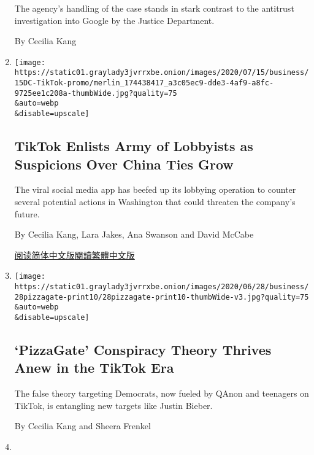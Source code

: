 \begin{enumerate}
  The agency's handling of the case stands in stark contrast to the
  antitrust investigation into Google by the Justice Department.

  By Cecilia Kang
\item
  \href{/2020/07/15/technology/tiktok-washington-lobbyist.html}{}

  \texttt{[image: https://static01.graylady3jvrrxbe.onion/images/2020/07/15/business/15DC-TikTok-promo/merlin\_174438417\_a3c05ec9-dde3-4af9-a8fc-9725ee1c208a-thumbWide.jpg?quality=75\\\&auto=webp\\\&disable=upscale]}

  \hypertarget{tiktok-enlists-army-of-lobbyists-as-suspicions-over-china-ties-grow}{%
  \subsection{TikTok Enlists Army of Lobbyists as Suspicions Over China
  Ties
  Grow}\label{tiktok-enlists-army-of-lobbyists-as-suspicions-over-china-ties-grow}}

  The viral social media app has beefed up its lobbying operation to
  counter several potential actions in Washington that could threaten
  the company's future.

  By Cecilia Kang, Lara Jakes, Ana Swanson and David McCabe

  \href{https://cn.nytimes3xbfgragh.onion/technology/20200716/tiktok-washington-lobbyist/}{阅读简体中文版}\href{https://cn.nytimes3xbfgragh.onion/technology/20200716/tiktok-washington-lobbyist/zh-hant/}{閱讀繁體中文版}
\item
  \href{/2020/06/27/technology/pizzagate-justin-bieber-qanon-tiktok.html}{}

  \texttt{[image: https://static01.graylady3jvrrxbe.onion/images/2020/06/28/business/28pizzagate-print10/28pizzagate-print10-thumbWide-v3.jpg?quality=75\\\&auto=webp\\\&disable=upscale]}

  \hypertarget{pizzagate-conspiracy-theory-thrives-anew-in-the-tiktok-era}{%
  \subsection{`PizzaGate' Conspiracy Theory Thrives Anew in the TikTok
  Era}\label{pizzagate-conspiracy-theory-thrives-anew-in-the-tiktok-era}}

  The false theory targeting Democrats, now fueled by QAnon and
  teenagers on TikTok, is entangling new targets like Justin Bieber.

  By Cecilia Kang and Sheera Frenkel
\item
  \href{/2020/06/25/technology/barr-google-investigation.html}{}


\end{enumerate}
